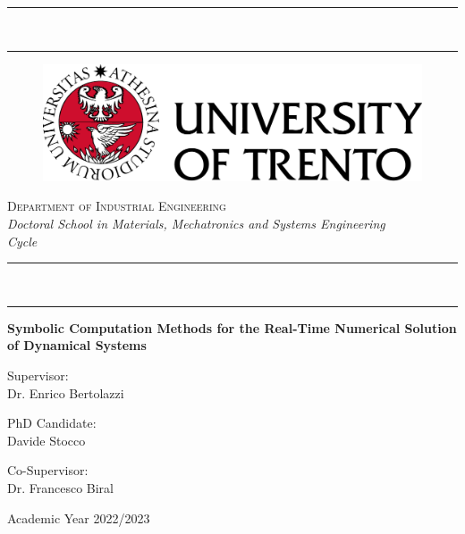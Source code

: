 
\begin{titlepage}
%
\setlength\parindent{0pt}
\setlength{\topmargin}{-20mm}
\setlength{\voffset}{0mm}
%
\begin{center}
  \rule[0.1cm]{10.5cm}{0.6mm} \\ %
  \rule[0.5cm]{10.5cm}{0.3mm}
\end{center}
%
\vspace{-5mm}
%
\begin{figure}[h]
  \centering
  \includegraphics[scale=0.5]{./figures/frontmatter/logo.png}
\end{figure}
%
\begin{center}
  \Large{\textsc{Department of Industrial Engineering}} \\
  \vspace{2mm}
  \large{\textsl{Doctoral School in Materials, Mechatronics and Systems Engineering}} \\
  \large{ \textsl{Cycle}}
\end{center}
%
\begin{center}
  \rule[0.1cm]{10.5cm}{0.3mm} \\ %
  \rule[0.5cm]{10.5cm}{0.6mm}
\end{center}
%
\begin{center}
  \LARGE{\textbf{Symbolic Computation Methods for the Real-Time Numerical Solution of Dynamical Systems}} \\
\end{center}
%
\vspace{15mm}
%
\begin{minipage}[t]{0.49\textwidth}
  \large{\sc Supervisor:} \\
  Dr. Enrico Bertolazzi
\end{minipage}
\hfill
\begin{minipage}[t]{0.49\textwidth}\raggedleft
  \large{\sc PhD Candidate:} \\
  Davide Stocco
  \vspace{5mm}
\end{minipage}
%
\begin{minipage}[t]{0.49\textwidth}
  \large{\sc Co-Supervisor:} \\
  Dr. Francesco Biral
\end{minipage}
%
\vspace{17mm}
%
\begin{center}
  {\large{\sc Academic Year 2022/2023}}
\end{center}

\end{titlepage}